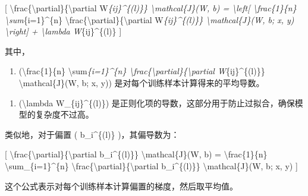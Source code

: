 {[}
\textbackslash frac\{\textbackslash partial\}\{\textbackslash partial
W\emph{\{ij\}\^{}\{(l)\}\} \textbackslash mathcal\{J\}(W, b) =
\textbackslash left{[} \textbackslash frac\{1\}\{n\}
\textbackslash sum}\{i=1\}\^{}\{n\}
\textbackslash frac\{\textbackslash partial\}\{\textbackslash partial
W\emph{\{ij\}\^{}\{(l)\}\} \textbackslash mathcal\{J\}(W, b; x, y)
\textbackslash right{]} + \textbackslash lambda W}\{ij\}\^{}\{(l)\} {]}


其中，

\begin{enumerate}
\def\labelenumi{\arabic{enumi}.}
\item
  (\textbackslash frac\{1\}\{n\}
  \textbackslash sum\emph{\{i=1\}\^{}\{n\}
  \textbackslash frac\{\textbackslash partial\}\{\textbackslash partial
  W}\{ij\}\^{}\{(l)\}\} \textbackslash mathcal\{J\}(W, b; x, y))
  是对每个训练样本计算得来的平均导数。
\end{enumerate}


\begin{enumerate}
\def\labelenumi{\arabic{enumi}.}
\item
  (\textbackslash lambda W\_\{ij\}\^{}\{(l)\})
  是正则化项的导数，这部分用于防止过拟合，确保模型的复杂度不过高。
\end{enumerate}


类似地，对于偏置 ( b\_i\^{}\{(l)\} )，其偏导数为：

{[}
\textbackslash frac\{\textbackslash partial\}\{\textbackslash partial
b\_i\^{}\{(l)\}\} \textbackslash mathcal\{J\}(W, b) =
\textbackslash frac\{1\}\{n\} \textbackslash sum\_\{i=1\}\^{}\{n\}
\textbackslash frac\{\textbackslash partial\}\{\textbackslash partial
b\_i\^{}\{(l)\}\} \textbackslash mathcal\{J\}(W, b; x, y) {]}


这个公式表示对每个训练样本计算偏置的梯度，然后取平均值。

